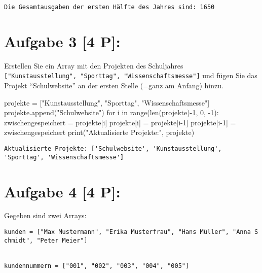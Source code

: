 \documentclass[
  letterpaper,
  DIV=11,
  numbers=noendperiod]{scrartcl}
\newenvironment{Shaded}{\begin{snugshade}}{\end{snugshade}}
\newcommand{\BuiltInTok}[1]{\textcolor[rgb]{0.00,0.23,0.31}{#1}}
\newcommand{\ControlFlowTok}[1]{\textcolor[rgb]{0.00,0.23,0.31}{#1}}
\newcommand{\DecValTok}[1]{\textcolor[rgb]{0.68,0.00,0.00}{#1}}
\newcommand{\KeywordTok}[1]{\textcolor[rgb]{0.00,0.23,0.31}{#1}}
\newcommand{\NormalTok}[1]{\textcolor[rgb]{0.00,0.23,0.31}{#1}}
\newcommand{\OperatorTok}[1]{\textcolor[rgb]{0.37,0.37,0.37}{#1}}
\newcommand{\StringTok}[1]{\textcolor[rgb]{0.13,0.47,0.30}{#1}}
\begin{document}
\begin{verbatim}
Die Gesamtausgaben der ersten Hälfte des Jahres sind: 1650
\end{verbatim}

\section{Aufgabe 3 {[}4 P{]}:}\label{aufgabe-3-4-p}

Erstellen Sie ein Array mit den Projekten des Schuljahres
\texttt{{[}"Kunstausstellung",\ "Sporttag",\ "Wissenschaftsmesse"{]}}
und fügen Sie das Projekt ``Schulwebsite'' an der ersten Stelle (=ganz
am Anfang) hinzu.

\begin{Shaded}
\begin{Highlighting}[]
\NormalTok{projekte }\OperatorTok{=}\NormalTok{ [}\StringTok{"Kunstausstellung"}\NormalTok{, }\StringTok{"Sporttag"}\NormalTok{, }\StringTok{"Wissenschaftsmesse"}\NormalTok{]}
\NormalTok{projekte.append(}\StringTok{"Schulwebsite"}\NormalTok{)}
\ControlFlowTok{for}\NormalTok{ i }\KeywordTok{in} \BuiltInTok{range}\NormalTok{(}\BuiltInTok{len}\NormalTok{(projekte)}\OperatorTok{{-}}\DecValTok{1}\NormalTok{, }\DecValTok{0}\NormalTok{, }\OperatorTok{{-}}\DecValTok{1}\NormalTok{):}
\NormalTok{    zwischengespeichert }\OperatorTok{=}\NormalTok{ projekte[i]}
\NormalTok{    projekte[i] }\OperatorTok{=}\NormalTok{ projekte[i}\OperatorTok{{-}}\DecValTok{1}\NormalTok{]}
\NormalTok{    projekte[i}\OperatorTok{{-}}\DecValTok{1}\NormalTok{] }\OperatorTok{=}\NormalTok{ zwischengespeichert}
\BuiltInTok{print}\NormalTok{(}\StringTok{"Aktualisierte Projekte:"}\NormalTok{, projekte)}
\end{Highlighting}
\end{Shaded}

\begin{verbatim}
Aktualisierte Projekte: ['Schulwebsite', 'Kunstausstellung', 'Sporttag', 'Wissenschaftsmesse']
\end{verbatim}

\section{Aufgabe 4 {[}4 P{]}:}\label{aufgabe-4-4-p}

Gegeben sind zwei Arrays:

\texttt{kunden\ =\ {[}"Max\ Mustermann",\ "Erika\ Musterfrau",\ "Hans\ Müller",\ "Anna\ Schmidt",\ "Peter\ Meier"{]}}\strut \\
\texttt{kundennummern\ =\ {[}"001",\ "002",\ "003",\ "004",\ "005"{]}}
\end{document}
